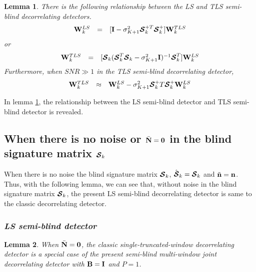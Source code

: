 \documentclass[a4paper,11pt,fleqn]{article}
\newtheorem{lemma}{Lemma}
\newcommand{\bn}{{\bf n}}
\newcommand{\bN}{{\bf N}}
\newcommand{\bI}{{\bf I}}
\newcommand{\bW}{{\bf W}}
\newcommand{\bB}{{\bf B}}
\newcommand{\bcS}{{\mbox {\boldmath ${\cal S}$}}}
\begin{document}
\begin{lemma}
There is the following relationship between the LS and TLS
semi-blind decorrelating detectors.
\begin{equation}
\begin{array}{rcl}
\bW_k^{LS}&=&[\bI-\sigma_{K+1}^2\bcS_k^{+T}\bcS_k^{+}]\bW_k^{TLS}
\end{array}
\end{equation}
or
\begin{equation}
\begin{array}{rcl}
\bW_k^{TLS}&=&[\bcS_k(\bcS_k^T\bcS_k-\sigma_{K+1}^2\bI)^{-1}\bcS_k^T]\bW_k^{LS}
\end{array}
\end{equation}
Furthermore, when $SNR\gg 1$ in the TLS semi-blind decorrelating
detector,
\begin{equation}
\begin{array}{rcl}
\bW_k^{TLS}&\approx&\bW_k^{LS}-\sigma_{K+1}^2\bcS_k^+T\bcS_k^+\bW_k^{LS}
\end{array}
\end{equation} \label{w}

\end{lemma}

In lemma \ref{w}, the relationship between the LS semi-blind
detector and TLS semi-blind detector is revealed.

\subsection*{When there is no noise or $\bar{\bN}=\mathbf{0}$ in the blind signature matrix $\bcS_k$}

When there is no noise the blind signature matrix $\bcS_k$,
$\hat{\bcS}_k=\bcS_k$ and $\tilde{\bn}=\bn$. Thus, with the
following lemma, we can see that, without noise in the blind
signature matrix $\bcS_k$, the present LS semi-blind decorrelating
detector is same to the classic decorrelating detector.

\subsubsection*{\em LS semi-blind detector \em }

\begin{lemma}
When $\bar{\bN}=\mathbf{0}$, the classic single-truncated-window
decorrelating detector is a special case of the present semi-blind
multi-window joint decorrelating detector with $\bB =\bI$ and
$P=1$.
\end{lemma}
\end{document}
